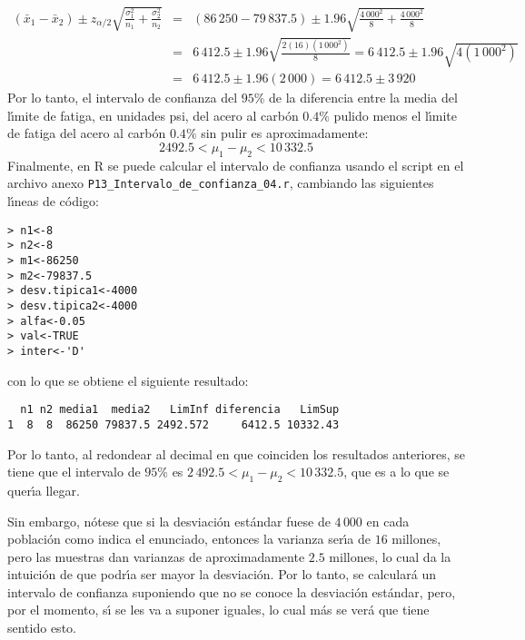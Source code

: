 \begin{solucion}
 \begin{eqnarray*}
  \left( \bar{x}_1 - \bar{x}_2 \right) \pm z_{\alpha/2}\sqrt{\frac{\sigma_1^2}{n_1} + \frac{\sigma_2^2}{n_2}} & = & (86\,250 - 79\,837.5) \pm 1.96\sqrt{\frac{4\,000^2}{8} + \frac{4\,000^2}{8}} \\
  & = & 6\,412.5 \pm 1.96 \sqrt{\frac{2(16)\left(1\,000^2\right)}{8}} = 6\,412.5 \pm 1.96 \sqrt{4\left( 1\,000^2 \right)} \\
  & = & 6\,412.5 \pm 1.96 (2\,000) = 6\,412.5 \pm 3\,920
 \end{eqnarray*}
 Por lo tanto, el intervalo de confianza del $95\%$ de la diferencia entre la media del l\'{\i}mite de fatiga, en unidades psi, del acero al carb\'on $0.4\%$ pulido menos el l\'{\i}mite de fatiga del acero al carb\'on $0.4\%$ sin pulir es aproximadamente:
 \begin{equation*}
  2492.5 < \mu_1 - \mu_2 < 10\,332.5
 \end{equation*}
 Finalmente, en R se puede calcular el intervalo de confianza usando el script en el archivo anexo \texttt{P13\_Intervalo\_de\_confianza\_04.r}, cambiando las siguientes l\'{\i}neas de c\'odigo:
 \begin{verbatim}
> n1<-8
> n2<-8
> m1<-86250
> m2<-79837.5
> desv.tipica1<-4000
> desv.tipica2<-4000
> alfa<-0.05
> val<-TRUE
> inter<-'D'
 \end{verbatim}
 \vspace{-0.5cm}
 con lo que se obtiene el siguiente resultado:
 \begin{verbatim}
  n1 n2 media1  media2   LimInf diferencia   LimSup
1  8  8  86250 79837.5 2492.572     6412.5 10332.43
 \end{verbatim}
 \vspace{-0.5cm}
 Por lo tanto, al redondear al decimal en que coinciden los resultados anteriores, se tiene que el intervalo de $95\%$ es $2\,492.5 < \mu_1 - \mu_2 < 10\,332.5$, que es a lo que se quer\'{\i}a llegar.
 \par 
 Sin embargo, n\'otese que si la desviaci\'on est\'andar fuese de $4\,000$ en cada poblaci\'on como indica el enunciado, entonces la varianza ser\'{\i}a de $16$ millones, pero las muestras dan varianzas de aproximadamente $2.5$ millones, lo cual da la intuici\'on de que podr\'{\i}a ser mayor la desviaci\'on. Por lo tanto, se calcular\'a un intervalo de confianza suponiendo que no se conoce la desviaci\'on est\'andar, pero, por el momento, s\'{\i} se les va a suponer iguales, lo cual m\'as se ver\'a que tiene sentido esto.
 \par 

\end{solucion}

